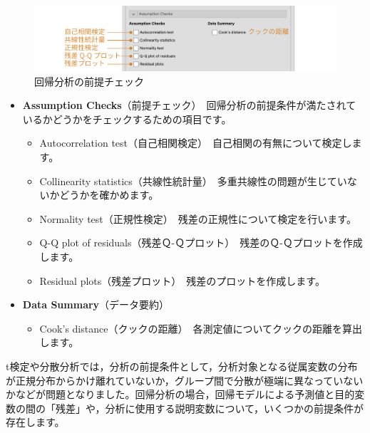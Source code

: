 \documentclass[
  12pt,
  a5jpaper,
  lualatex, ja=standard]{bxjsbook}
\providecommand{\tightlist}{%
  \setlength{\itemsep}{0pt}\setlength{\parskip}{0pt}}
\newenvironment{jmvsettings}{%
	\begin{center}%
	\begin{tcolorbox}[%
		title=設定項目,
		colframe=gmoji,
		colbacktitle=gmoji,
		colback=gmoji!2!white,
		breakable,
		width=.9\textwidth,
		]\small\addtolength{\leftmargini}{-3\labelsep}%
	}%
	{\end{tcolorbox}\end{center}}
\begin{document}
\begin{figure}[!ht]

{\centering \includegraphics[width=1\linewidth]{images/regression/lr-assumption} 

}

\caption{回帰分析の前提チェック}\label{fig:regression-lr-assumption}
\end{figure}

\begin{jmvsettings}

\begin{itemize}
\tightlist
\item
  \textbf{Assumption Checks}（前提チェック）　回帰分析の前提条件が満たされているかどうかをチェックするための項目です。

  \begin{itemize}
  \tightlist
  \item
    Autocorrelation test（自己相関検定）　自己相関の有無について検定します。
  \item
    Collinearity statistics（共線性統計量）　多重共線性の問題が生じていないかどうかを確かめます。
  \item
    Normality test（正規性検定）　残差の正規性について検定を行います。
  \item
    Q-Q plot of residuals（残差Ｑ-Ｑプロット）　残差のＱ-Ｑプロットを作成します。
  \item
    Residual plots（残差プロット）　残差のプロットを作成します。
  \end{itemize}
\item
  \textbf{Data Summary}（データ要約）

  \begin{itemize}
  \tightlist
  \item
    Cook's distance（クックの距離）　各測定値についてクックの距離を算出します。
  \end{itemize}
\end{itemize}

\end{jmvsettings}

t検定や分散分析では，分析の前提条件として，分析対象となる従属変数の分布が正規分布からかけ離れていないか，グループ間で分散が極端に異なっていないかなどが問題となりました。回帰分析の場合，回帰モデルによる予測値と目的変数の間の「残差」や，分析に使用する説明変数について，いくつかの前提条件が存在します。
\end{document}
